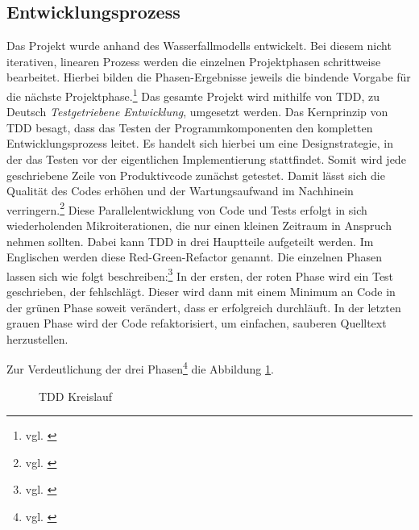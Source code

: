 \subsection{Entwicklungsprozess}
\label{sec:Entwicklungsprozess}
Das Projekt wurde anhand des Wasserfallmodells entwickelt.
Bei diesem nicht iterativen, linearen Prozess werden die einzelnen Projektphasen schrittweise bearbeitet. Hierbei bilden die Phasen-Ergebnisse jeweils die bindende Vorgabe für die nächste Projektphase.\footnote{vgl. \cite[S. 263]{ItHandbuch}}
Das gesamte Projekt wird mithilfe von \ac{TDD}, zu Deutsch \textit{Testgetriebene Entwicklung}, umgesetzt werden. Das Kernprinzip von \ac{TDD} besagt, dass das Testen der Programmkomponenten den kompletten Entwicklungsprozess leitet.
Es handelt sich hierbei um eine Designstrategie, in der das Testen vor der eigentlichen Implementierung stattfindet. Somit wird jede geschriebene Zeile von Produktivcode zunächst getestet.
Damit lässt sich die Qualität des Codes erhöhen und der Wartungsaufwand im Nachhinein verringern.\footnote{vgl. \cite{datenschutzbeauftragter}}
Diese Parallelentwicklung von Code und Tests erfolgt in sich wiederholenden Mikroiterationen, die nur einen kleinen Zeitraum in Anspruch nehmen sollten. Dabei kann \ac{TDD} in drei Hauptteile aufgeteilt werden. Im Englischen werden diese \glqq Red-Green-Refactor\grqq{} genannt. 
Die einzelnen Phasen lassen sich wie folgt beschreiben:\footnote{vgl. \cite{tddwiki}}
In der ersten, der roten Phase wird ein Test geschrieben, der fehlschlägt. Dieser wird dann mit einem Minimum an Code in der grünen Phase soweit verändert, dass er erfolgreich durchläuft. In der letzten grauen Phase wird der Code refaktorisiert, um einfachen, sauberen Quelltext herzustellen. 

Zur Verdeutlichung der drei Phasen\footnote{vgl. \cite{tddcircle}} die Abbildung \ref{fig:tddcircle}.
\begin{figure}[htb!]
\centering
{}
\caption{\ac{TDD} Kreislauf}
\label{fig:tddcircle}%
\end{figure}